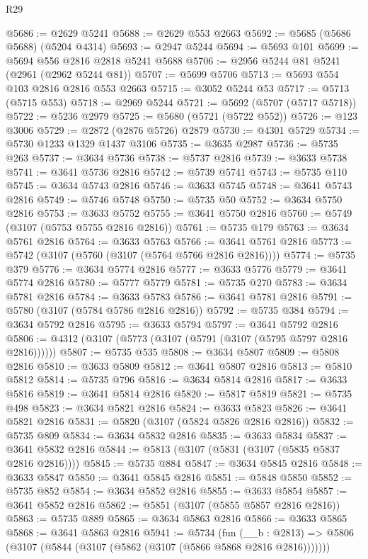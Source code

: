 \begin{lexlean}{R29}
\begin{coremodule}
@5686 := @2629 @5241
@5688 := @2629 @553 @2663
@5692 := @5685 (@5686 @5688) (@5204 @4314)
@5693 := @2947 @5244
@5694 := @5693 @101
@5699 := @5694 @556 @2816 @2818 @5241 @5688
@5706 := @2956 @5244 @81 @5241 (@2961 (@2962 @5244 @81))
@5707 := @5699 @5706
@5713 := @5693 @554 @103 @2816 @2816 @553 @2663
@5715 := @3052 @5244 @53
@5717 := @5713 (@5715 @553)
@5718 := @2969 @5244
@5721 := @5692 (@5707 (@5717 @5718))
@5722 := @5236 @2979
@5725 := @5680 (@5721 (@5722 @552))
@5726 := @123 @3006
@5729 := @2872 (@2876 @5726) @2879
@5730 := @4301 @5729
@5734 := @5730 @1233 @1329 @1437 @3106
@5735 := @3635 @2987
@5736 := @5735 @263
@5737 := @3634 @5736
@5738 := @5737 @2816
@5739 := @3633 @5738
@5741 := @3641 @5736 @2816
@5742 := @5739 @5741
@5743 := @5735 @110
@5745 := @3634 @5743 @2816
@5746 := @3633 @5745
@5748 := @3641 @5743 @2816
@5749 := @5746 @5748
@5750 := @5735 @50
@5752 := @3634 @5750 @2816
@5753 := @3633 @5752
@5755 := @3641 @5750 @2816
@5760 := @5749 (@3107 (@5753 @5755 @2816 @2816))
@5761 := @5735 @179
@5763 := @3634 @5761 @2816
@5764 := @3633 @5763
@5766 := @3641 @5761 @2816
@5773 := @5742 (@3107 (@5760 (@3107 (@5764 @5766 @2816 @2816))))
@5774 := @5735 @379
@5776 := @3634 @5774 @2816
@5777 := @3633 @5776
@5779 := @3641 @5774 @2816
@5780 := @5777 @5779
@5781 := @5735 @270
@5783 := @3634 @5781 @2816
@5784 := @3633 @5783
@5786 := @3641 @5781 @2816
@5791 := @5780 (@3107 (@5784 @5786 @2816 @2816))
@5792 := @5735 @384
@5794 := @3634 @5792 @2816
@5795 := @3633 @5794
@5797 := @3641 @5792 @2816
@5806 := @4312 (@3107 (@5773 (@3107 (@5791 (@3107 (@5795 @5797 @2816 @2816))))))
@5807 := @5735 @535
@5808 := @3634 @5807
@5809 := @5808 @2816
@5810 := @3633 @5809
@5812 := @3641 @5807 @2816
@5813 := @5810 @5812
@5814 := @5735 @796
@5816 := @3634 @5814 @2816
@5817 := @3633 @5816
@5819 := @3641 @5814 @2816
@5820 := @5817 @5819
@5821 := @5735 @498
@5823 := @3634 @5821 @2816
@5824 := @3633 @5823
@5826 := @3641 @5821 @2816
@5831 := @5820 (@3107 (@5824 @5826 @2816 @2816))
@5832 := @5735 @809
@5834 := @3634 @5832 @2816
@5835 := @3633 @5834
@5837 := @3641 @5832 @2816
@5844 := @5813 (@3107 (@5831 (@3107 (@5835 @5837 @2816 @2816))))
@5845 := @5735 @884
@5847 := @3634 @5845 @2816
@5848 := @3633 @5847
@5850 := @3641 @5845 @2816
@5851 := @5848 @5850
@5852 := @5735 @852
@5854 := @3634 @5852 @2816
@5855 := @3633 @5854
@5857 := @3641 @5852 @2816
@5862 := @5851 (@3107 (@5855 @5857 @2816 @2816))
@5863 := @5735 @889
@5865 := @3634 @5863 @2816
@5866 := @3633 @5865
@5868 := @3641 @5863 @2816
@5941 := @5734
    (fun (__b : @2813) => @5806 (@3107 (@5844 (@3107 (@5862 (@3107 (@5866 @5868 @2816 @2816)))))))

\end{coremodule}
\end{lexlean}

